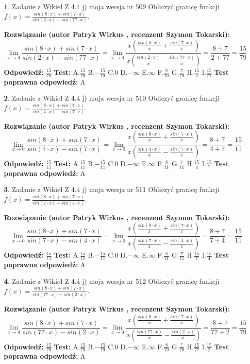 \documentclass[12pt, a4paper]{article}
\theoremstyle{definition} %
\newtheorem{zad}{}
\newcommand{\zadStart}[1]{\begin{zad}#1\newline}
\newcommand{\zadStop}{\end{zad}}
\newcommand{\rozwStart}[2]{\noindent \textbf{Rozwiązanie (autor #1 , recenzent #2): }\newline}
\newcommand{\rozwStop}{\newline}
\newcommand{\odpStart}{\noindent \textbf{Odpowiedź:}\newline}
\newcommand{\odpStop}{\newline}
\newcommand{\testStart}{\noindent \textbf{Test:}\newline}
\newcommand{\testStop}{\newline}
\newcommand{\kluczStart}{\noindent \textbf{Test poprawna odpowiedź:}\newline}
\newcommand{\kluczStop}{\newline}
\begin{document}
\zadStart{Zadanie z Wikieł Z 4.4 j) moja wersja nr 509}
Obliczyć granicę funkcji $f(x)=\frac{sin(8\cdot x) +sin(7\cdot x)}{sin(2\cdot x) -sin(77\cdot x)}$.
\zadStop
\rozwStart{Patryk Wirkus}{Szymon Tokarski}
$$\lim\limits_{x\to 0}\frac{sin(8\cdot x) +sin(7\cdot x)}{sin(2\cdot x) -sin(77\cdot x)}=\lim\limits_{x\to 0}\frac{x(\frac{sin(8\cdot x)}{x}+\frac{sin(7\cdot x)}{x})}{x(\frac{sin(2\cdot x)}{x}-\frac{sin(77\cdot x)}{x})}=\frac{8+7}{2+77} = \frac{15}{79}$$
\rozwStop
\odpStart
$\frac{15}{79}$
\odpStop
\testStart
A.$\frac{15}{79}$
B.$-\frac{15}{79}$
C.$0$
D.$-\infty$
E.$\infty$
F.$\frac{8}{79}$
G.$\frac{7}{79}$
H.$\frac{15}{2}$
I.$\frac{15}{77}$
\testStop
\kluczStart
A
\kluczStop



\zadStart{Zadanie z Wikieł Z 4.4 j) moja wersja nr 510}
Obliczyć granicę funkcji $f(x)=\frac{sin(8\cdot x) +sin(7\cdot x)}{sin(4\cdot x) -sin(7\cdot x)}$.
\zadStop
\rozwStart{Patryk Wirkus}{Szymon Tokarski}
$$\lim\limits_{x\to 0}\frac{sin(8\cdot x) +sin(7\cdot x)}{sin(4\cdot x) -sin(7\cdot x)}=\lim\limits_{x\to 0}\frac{x(\frac{sin(8\cdot x)}{x}+\frac{sin(7\cdot x)}{x})}{x(\frac{sin(4\cdot x)}{x}-\frac{sin(7\cdot x)}{x})}=\frac{8+7}{4+7} = \frac{15}{11}$$
\rozwStop
\odpStart
$\frac{15}{11}$
\odpStop
\testStart
A.$\frac{15}{11}$
B.$-\frac{15}{11}$
C.$0$
D.$-\infty$
E.$\infty$
F.$\frac{8}{11}$
G.$\frac{7}{11}$
H.$\frac{15}{4}$
I.$\frac{15}{7}$
\testStop
\kluczStart
A
\kluczStop



\zadStart{Zadanie z Wikieł Z 4.4 j) moja wersja nr 511}
Obliczyć granicę funkcji $f(x)=\frac{sin(8\cdot x) +sin(7\cdot x)}{sin(7\cdot x) -sin(4\cdot x)}$.
\zadStop
\rozwStart{Patryk Wirkus}{Szymon Tokarski}
$$\lim\limits_{x\to 0}\frac{sin(8\cdot x) +sin(7\cdot x)}{sin(7\cdot x) -sin(4\cdot x)}=\lim\limits_{x\to 0}\frac{x(\frac{sin(8\cdot x)}{x}+\frac{sin(7\cdot x)}{x})}{x(\frac{sin(7\cdot x)}{x}-\frac{sin(4\cdot x)}{x})}=\frac{8+7}{7+4} = \frac{15}{11}$$
\rozwStop
\odpStart
$\frac{15}{11}$
\odpStop
\testStart
A.$\frac{15}{11}$
B.$-\frac{15}{11}$
C.$0$
D.$-\infty$
E.$\infty$
F.$\frac{8}{11}$
G.$\frac{7}{11}$
H.$\frac{15}{7}$
I.$\frac{15}{4}$
\testStop
\kluczStart
A
\kluczStop



\zadStart{Zadanie z Wikieł Z 4.4 j) moja wersja nr 512}
Obliczyć granicę funkcji $f(x)=\frac{sin(8\cdot x) +sin(7\cdot x)}{sin(77\cdot x) -sin(2\cdot x)}$.
\zadStop
\rozwStart{Patryk Wirkus}{Szymon Tokarski}
$$\lim\limits_{x\to 0}\frac{sin(8\cdot x) +sin(7\cdot x)}{sin(77\cdot x) -sin(2\cdot x)}=\lim\limits_{x\to 0}\frac{x(\frac{sin(8\cdot x)}{x}+\frac{sin(7\cdot x)}{x})}{x(\frac{sin(77\cdot x)}{x}-\frac{sin(2\cdot x)}{x})}=\frac{8+7}{77+2} = \frac{15}{79}$$
\rozwStop
\odpStart
$\frac{15}{79}$
\odpStop
\testStart
A.$\frac{15}{79}$
B.$-\frac{15}{79}$
C.$0$
D.$-\infty$
E.$\infty$
F.$\frac{8}{79}$
G.$\frac{7}{79}$
H.$\frac{15}{77}$
I.$\frac{15}{2}$
\testStop
\kluczStart
A
\kluczStop
\end{document}
